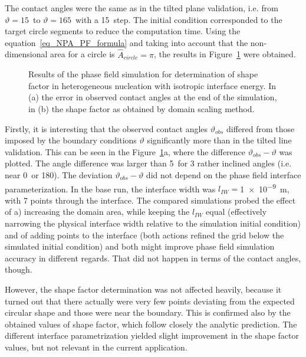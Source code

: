 The contact angles were the same as in the tilted plane validation, i.e. from $\vartheta=15$\textdegree~to $\vartheta=165$\textdegree~with a 15\textdegree~step. The initial condition corresponded to the target circle segments to reduce the computation time. Using the equation~\eqref{eq_NPA_PF_formula} and taking into account that the non-dimensional area for a circle is $\hat{A}_{circle}=\pi$, the results in Figure~\ref{fig_result_NPA_PF_S_iso} were obtained.
\begin{figure}
	\centering
	\caption{Results of the phase field simulation for determination of shape factor in heterogeneous nucleation with isotropic interface energy. In (a) the error in observed contact angles at the end of the simulation, in (b) the shape factor as obtained by domain scaling method.}
	\label{fig_result_NPA_PF_S_iso}
\end{figure}

Firstly, it is interesting that the observed contact angles $\vartheta_{obs}$ differed from those imposed by the boundary conditions $\vartheta$ significantly more than in the tilted line validation. This can be seen in the Figure~\ref{fig_result_NPA_PF_S_iso}a, where the difference $\vartheta_{obs}-\vartheta$ was plotted. The angle difference was larger than 5\textdegree~for 3 rather inclined angles (i.e. near 0\textdegree~or 180\textdegree). The deviation $\vartheta_{obs}-\vartheta$ did not depend on the phase field interface parameterization. In the base run, the interface width was $l_{IW}=$\qty{1e-9}{\m}, with 7 points through the interface. The compared simulations probed the effect of a) increasing the domain area, while keeping the $l_{IW}$ equal (effectively narrowing the physical interface width relative to the simulation initial condition) and of adding points to the interface (both actions refined the grid below the simulated initial condition) and both might improve phase field simulation accuracy in different regards. That did not happen in terms of the contact angles, though.

However, the shape factor determination was not affected heavily, because it turned out that there actually were very few points deviating from the expected circular shape and those were near the boundary. This is confirmed also by the obtained values of shape factor, which follow closely the analytic prediction. The different interface parametrization yielded slight improvement in the shape factor values, but not relevant in the current application.

